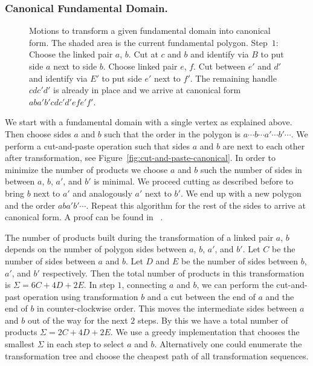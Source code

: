 \documentclass[Thesis]{subfiles}
\begin{document}
\subsubsection*{Canonical Fundamental Domain.}

\begin{figure}
\centering
{}
\caption{Motions to transform a given fundamental domain into canonical form. The shaded area is the current fundamental polygon. Step~$1$: Choose the linked pair $a$, $b$. Cut at $c$ and $b$ and identify via $B$ to put side $a$ next to side $b$. Choose linked pair $e$, $f$. Cut between $e'$ and $d'$ and identify via $E'$ to put side $e'$ next to $f'$. The remaining handle $cdc'd'$ is already in place and we arrive at canonical form $aba'b'cdc'd'efe'f'$.}
\label{fig:canonical_algorithm}
\end{figure}

We start with a fundamental domain with a single vertex as explained above. Then choose sides $a$ and $b$ such that the order in the polygon is $a\cdots b \cdots a' \cdots b' \cdots$. We perform a cut-and-paste operation such that sides $a$ and $b$ are next to each other after transformation, see Figure~\ref{fig:cut-and-paste-canonical}. In order to minimize the number of products we choose $a$ and $b$ such the number of sides in between $a$, $b$, $a'$, and $b'$ is minimal. We proceed cutting as described before to bring $b$ next to $a'$ and analogously $a'$ next to $b'$. We end up with a new polygon and the order $aba'b'\cdots$. Repeat this algorithm for the rest of the sides to arrive at canonical form. A proof can be found in ~\cite{Jost2007}.

The number of products built during the transformation of a linked pair $a$, $b$ depends on the number of polygon sides between $a$, $b$, $a'$, and $b'$. Let $C$ be the number of sides between $a$ and $b$. Let $D$ and $E$ be the number of sides between $b$, $a'$, and $b'$ respectively. Then the total number of products in this transformation is $\Sigma=6C+4D+2E$. In step $1$, connecting $a$ and $b$, we can perform the cut-and-past operation using transformation $b$ and a cut between the end of $a$ and the end of $b$ in counter-clockwise order. This moves the intermediate sides between $a$ and $b$ out of the way for the next $2$ steps. By this we have a total number of products $\Sigma=2C+4D+2E$. We use a greedy implementation that chooses the smallest $\Sigma$ in each step to select $a$ and $b$. Alternatively one could enumerate the transformation tree and choose the cheapest path of all transformation sequences.
\end{document}
